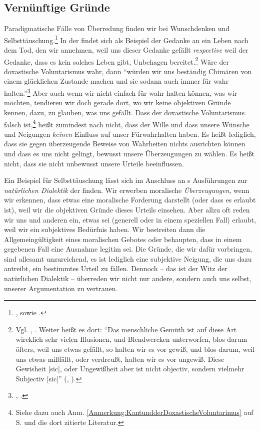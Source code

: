 \subsection{Vernünftige Gründe}\label{subsection:VernuenftigeGruende}
Paradigmatische Fälle von Überredung finden wir bei Wunschdenken und
Selbsttäuschung.\footnote{\cite[Vgl.][331]{Chignell:BeliefinKant2007}, sowie
\cite[][323]{Cohen:KantontheEthicsofBelief2014}.} In der 
findet sich als Beispiel der Gedanke an ein Leben nach dem Tod, den wir
annehmen, weil uns dieser Gedanke gefällt \emph{respective} weil der Gedanke,
dass es kein solches Leben gibt, Unbehagen bereitet.\footnote{Vgl.
\cite{Kant:LogikBlomberg1966}, \cite[][XXIV:
198.25--30]{Kant:GesammelteWerke1900ff.}. Weiter heißt es dort: \enquote{Das
menschliche Gemüth ist auf diese Art wircklich sehr vielen Illusionen, und
Blendwercken unterworfen, blos darum öfters, weil uns etwas gefällt, so halten
wir es vor gewiß, und blos darum, weil uns etwas mißfällt, oder verdreußt,
halten wir es vor ungewiß. Diese Gewisheit [sic], oder Ungewißheit aber ist
nicht objectiv, sondern vielmehr Subjectiv [sic]}
\mkbibparens{\cite{Kant:LogikBlomberg1966}, \cite[][XXIV:
198.31--36]{Kant:GesammelteWerke1900ff.}}.} Wäre der doxastische Voluntarismus
wahr, dann \enquote{würden wir uns beständig Chimären von einem glücklichen
Zustande machen und sie sodann auch immer für wahr halten.}\footnote{\cite[][A
113]{Kant:ImmanuelKantsLogik1977}, \cite[][IX:
74.4--5]{Kant:GesammelteWerke1900ff.}.} Aber auch wenn wir nicht
einfach für wahr halten können, was wir möchten, tendieren wir doch gerade dort,
wo wir keine objektiven Gründe kennen, dazu, zu glauben, was uns gefällt. Dass
der doxastische Voluntarismus falsch ist,\footnote{Siehe
dazu auch Anm. \ref{Anmerkung:KantundderDoxastischeVoluntarimus} auf S.
\pageref{Anmerkung:KantundderDoxastischeVoluntarimus} und die dort zitierte
Literatur.} heißt zumindest nach  nicht, dass der Wille und
dass unsere Wünsche und Neigungen \emph{keinen} Einfluss auf unser Fürwahrhalten
haben. Es heißt lediglich, dass sie gegen überzeugende Beweise von Wahrheiten
nichts ausrichten können und dass es uns nicht gelingt, bewusst unsere
Überzeugungen zu wählen. Es heißt nicht, dass sie nicht unbewusst unsere Urteile
beeinflussen.

Ein Beispiel für Selbsttäuschung lässt sich im Anschluss an
s Ausführungen zur \emph{natürlichen Dialektik} der
 finden.
Wir erwerben moralische \emph{Überzeugungen}, wenn wir erkennen, dass etwas eine
moralische Forderung darstellt (oder dass es erlaubt ist), weil wir die
objektiven Gründe dieses Urteils einsehen. Aber allzu oft reden wir uns und anderen ein, etwas sei
(generell oder in einem speziellen Fall) erlaubt, weil wir ein subjektives
Bedürfnis haben. Wir bestreiten dann die Allgemeingültigkeit eines moralischen
Gebotes oder behaupten, dass in einem gegebenen Fall eine Ausnahme legitim sei.
Die Gründe, die wir dafür vorbringen, sind allesamt unzureichend, es ist
lediglich eine subjektive Neigung, die uns dazu antreibt, ein bestimmtes Urteil
zu fällen. Dennoch -- das ist der Witz der natürlichen Dialektik -- überreden
wir nicht nur andere, sondern auch uns selbst, unserer Argumentation zu
vertrauen.

